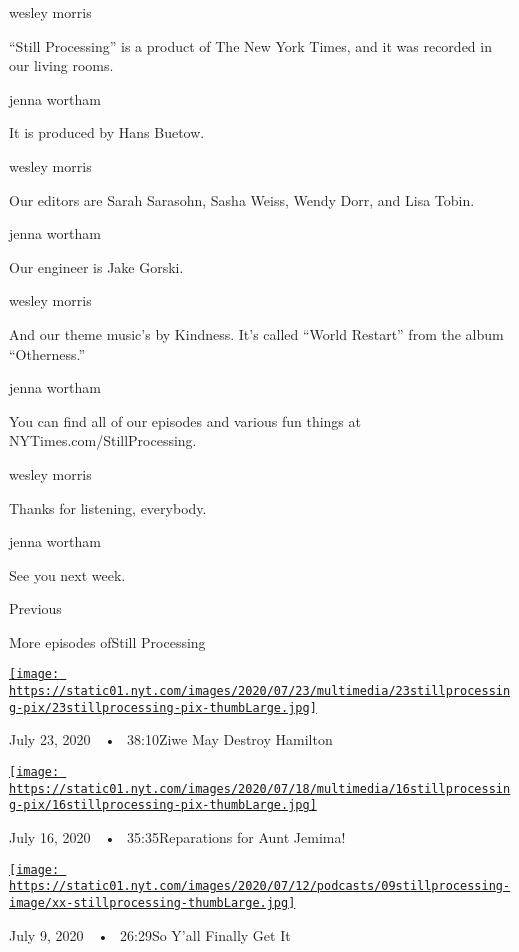 wesley morris

``Still Processing'' is a product of The New York Times, and it was
recorded in our living rooms.

jenna wortham

It is produced by Hans Buetow.

wesley morris

Our editors are Sarah Sarasohn, Sasha Weiss, Wendy Dorr, and Lisa Tobin.

jenna wortham

Our engineer is Jake Gorski.

wesley morris

And our theme music's by Kindness. It's called ``World Restart'' from
the album ``Otherness.''

jenna wortham

You can find all of our episodes and various fun things at
NYTimes.com/StillProcessing.

wesley morris

Thanks for listening, everybody.

jenna wortham

See you next week.

Previous

More episodes ofStill Processing

\href{https://www.nytimes.com/2020/07/23/podcasts/hamilton-ziwe-discomfort.html?action=click\&module=audio-series-bar\&region=header\&pgtype=Article}{\texttt{[image: https://static01.nyt.com/images/2020/07/23/multimedia/23stillprocessing-pix/23stillprocessing-pix-thumbLarge.jpg]}}

July 23, 2020~~•~ 38:10Ziwe May Destroy Hamilton

\href{https://www.nytimes.com/2020/07/16/podcasts/reparations-for-aunt-jemima.html?action=click\&module=audio-series-bar\&region=header\&pgtype=Article}{\texttt{[image: https://static01.nyt.com/images/2020/07/18/multimedia/16stillprocessing-pix/16stillprocessing-pix-thumbLarge.jpg]}}

July 16, 2020~~•~ 35:35Reparations for Aunt Jemima!

\href{https://www.nytimes.com/2020/07/09/podcasts/still-processing-black-lives-matter.html?action=click\&module=audio-series-bar\&region=header\&pgtype=Article}{\texttt{[image: https://static01.nyt.com/images/2020/07/12/podcasts/09stillprocessing-image/xx-stillprocessing-thumbLarge.jpg]}}

July 9, 2020~~•~ 26:29So Y'all Finally Get It

